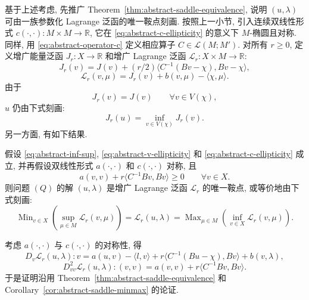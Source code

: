 基于上述考虑, 先推广 Theorem~\ref{thm:abstract-saddle-equivalence},
说明 $(u,\lambda)$ 可由一族参数化 Lagrange 泛函的唯一鞍点刻画.
按照上一小节, 引入连续双线性形式
$c(\cdot,\cdot):M\times M\to\mathbb R$, 它在
\eqref{eq:abstract-c-ellipticity} 的意义下 $M$-椭圆且对称.
同样, 用 
\eqref{eq:abstract-operator-c} 定义相应算子
$C\in\mathcal L(M;M')$. 对所有 $r\ge0$, 定义增广能量泛函
$J_r:X\to\mathbb R$ 和增广 Lagrange 泛函
$\mathcal L_r:X\times M\to\mathbb R$:
\begin{equation}\label{eq:abstract-augmented-energy}
J_r(v)=J(v)+(r/2)\langle C^{-1}(Bv-\chi),Bv-\chi\rangle,
\end{equation}
\begin{equation}\label{eq:abstract-augmented-lagrangian}
\mathcal L_r(v,\mu)=J_r(v)+b(v,\mu)-\langle\chi,\mu\rangle.
\end{equation}
由于
\[
J_r(v)=J(v)\qquad\forall v\in V(\chi),
\]
$u$ 仍由下式刻画:
\begin{equation}\label{eq:abstract-augmented-constrained-minimum}
J_r(u)=\inf_{v\in V(\chi)}J_r(v).
\end{equation}
另一方面, 有如下结果.

\setcounter{statement}{4}
\begin{Theorem}\label{thm:abstract-augmented-saddle}
假设 
\eqref{eq:abstract-inf-sup},
\eqref{eq:abstract-v-ellipticity} 和
\eqref{eq:abstract-c-ellipticity} 成立, 并再假设双线性形式
$a(\cdot,\cdot)$ 和 $c(\cdot,\cdot)$ 对称, 且
\begin{equation}\label{eq:abstract-augmented-semipositive}
a(v,v)+r\langle C^{-1}Bv,Bv\rangle\ge0
\qquad\forall v\in X.
\end{equation}
则问题 $(Q)$ 的解 $(u,\lambda)$ 是增广 Lagrange 泛函
$\mathcal L_r$ 的唯一鞍点, 或等价地由下式刻画:
\begin{equation}\label{eq:abstract-augmented-minmax}
\operatorname{Min}_{v\in X}
\left(\sup_{\mu\in M}\mathcal L_r(v,\mu)\right)
=\mathcal L_r(u,\lambda)
=\operatorname{Max}_{\mu\in M}
\left(\inf_{v\in X}\mathcal L_r(v,\mu)\right).
\end{equation}
\end{Theorem}
\begin{Proof}
考虑 $a(\cdot,\cdot)$ 与 $c(\cdot,\cdot)$ 的对称性, 得
\[
D_v\mathcal L_r(u,\lambda)\mathbin{:}v
=a(u,v)-\langle l,v\rangle
+r\langle C^{-1}(Bu-\chi),Bv\rangle+b(v,\lambda),
\]
\[
D_{vv}^2\mathcal L_r(u,\lambda)\mathbin{:}(v,v)
=a(v,v)+r\langle C^{-1}Bv,Bv\rangle.
\]
于是证明沿用 Theorem~\ref{thm:abstract-saddle-equivalence} 和
Corollary~\ref{cor:abstract-saddle-minmax} 的论证.
\end{Proof}

